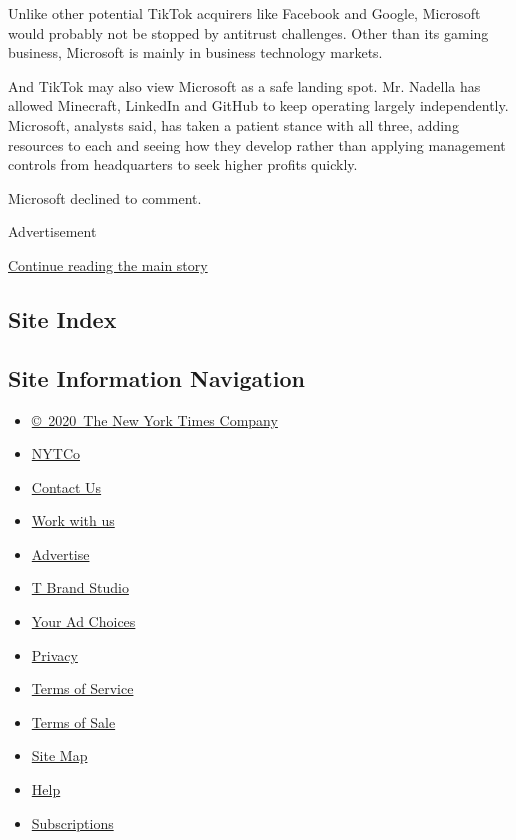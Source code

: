 Unlike other potential TikTok acquirers like Facebook and Google,
Microsoft would probably not be stopped by antitrust challenges. Other
than its gaming business, Microsoft is mainly in business technology
markets.

And TikTok may also view Microsoft as a safe landing spot. Mr. Nadella
has allowed Minecraft, LinkedIn and GitHub to keep operating largely
independently. Microsoft, analysts said, has taken a patient stance with
all three, adding resources to each and seeing how they develop rather
than applying management controls from headquarters to seek higher
profits quickly.

Microsoft declined to comment.

Advertisement

\protect\hyperlink{after-bottom}{Continue reading the main story}

\hypertarget{site-index}{%
\subsection{Site Index}\label{site-index}}

\hypertarget{site-information-navigation}{%
\subsection{Site Information
Navigation}\label{site-information-navigation}}

\begin{itemize}
\tightlist
\item
  \href{https://help.nytimes3xbfgragh.onion/hc/en-us/articles/115014792127-Copyright-notice}{©~2020~The
  New York Times Company}
\end{itemize}

\begin{itemize}
\tightlist
\item
  \href{https://www.nytco.com/}{NYTCo}
\item
  \href{https://help.nytimes3xbfgragh.onion/hc/en-us/articles/115015385887-Contact-Us}{Contact
  Us}
\item
  \href{https://www.nytco.com/careers/}{Work with us}
\item
  \href{https://nytmediakit.com/}{Advertise}
\item
  \href{http://www.tbrandstudio.com/}{T Brand Studio}
\item
  \href{https://www.nytimes3xbfgragh.onion/privacy/cookie-policy\#how-do-i-manage-trackers}{Your
  Ad Choices}
\item
  \href{https://www.nytimes3xbfgragh.onion/privacy}{Privacy}
\item
  \href{https://help.nytimes3xbfgragh.onion/hc/en-us/articles/115014893428-Terms-of-service}{Terms
  of Service}
\item
  \href{https://help.nytimes3xbfgragh.onion/hc/en-us/articles/115014893968-Terms-of-sale}{Terms
  of Sale}
\item
  \href{https://spiderbites.nytimes3xbfgragh.onion}{Site Map}
\item
  \href{https://help.nytimes3xbfgragh.onion/hc/en-us}{Help}
\item
  \href{https://www.nytimes3xbfgragh.onion/subscription?campaignId=37WXW}{Subscriptions}
\end{itemize}
